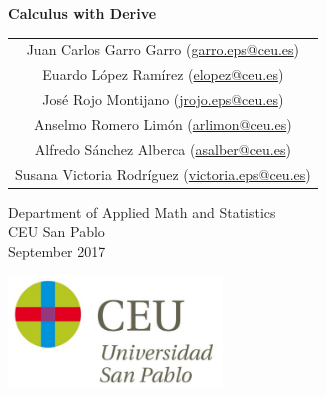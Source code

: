 \begin{titlepage}
\thispagestyle{empty}
\vspace*{7cm}
\par

\begin{center}
\normalfont\fontsize{30}{30}\selectfont
{\bfseries \color{blueceu}Calculus with Derive}
\end{center}
\vspace{1cm}

\begin{center}
\Large
\begin{tabular}{c}
Juan Carlos Garro Garro (\url{garro.eps@ceu.es})\\
Euardo López Ramírez (\url{elopez@ceu.es})\\
José Rojo Montijano (\url{jrojo.eps@ceu.es})\\
Anselmo Romero Limón (\url{arlimon@ceu.es})\\
Alfredo Sánchez Alberca (\href{mailto:asalber@ceu.es}{asalber@ceu.es})\\
Susana Victoria Rodríguez (\url{victoria.eps@ceu.es})
\end{tabular}

\medskip
Department of Applied Math and Statistics\\ CEU San Pablo\\[1cm]
\medskip
September 2017

\vspace{1cm}
\includegraphics[height=3cm]{img/logo_uspceu}
\end{center}
\vfill
\end{titlepage}
